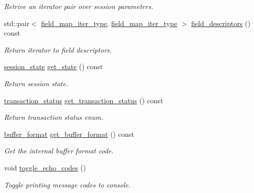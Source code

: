 \begin{DoxyCompactItemize}
\begin{DoxyCompactList}\small\item\em Retrive an iterator pair over session parameters. \end{DoxyCompactList}\item 
std\+::pair$<$ \hyperlink{classsession_a1124fe81d0a0c740c46f101818980aff}{field\+\_\+map\+\_\+iter\+\_\+type}, \hyperlink{classsession_a1124fe81d0a0c740c46f101818980aff}{field\+\_\+map\+\_\+iter\+\_\+type} $>$ \hyperlink{classsession_ab8aef6650e04d8c91bc6ab0b00bb3a81}{field\+\_\+descriptors} () const
\begin{DoxyCompactList}\small\item\em Return iterator to field descriptors. \end{DoxyCompactList}\item 
\mbox{\label{classsession_a974bcf86ffa980ca2677dbdf07907a91}} 
\hyperlink{classsession_a0975e57d194ae722629afe127b70a0b5}{session\+\_\+state} \hyperlink{classsession_a974bcf86ffa980ca2677dbdf07907a91}{get\+\_\+state} () const
\begin{DoxyCompactList}\small\item\em Return session state. \end{DoxyCompactList}\item 
\mbox{\label{classsession_a747aa3669a44dd3c8d1e365eb58b9d53}} 
\hyperlink{classsession_aeb070c1920b6b9948f2d98b4b8787ddb}{transaction\+\_\+status} \hyperlink{classsession_a747aa3669a44dd3c8d1e365eb58b9d53}{get\+\_\+transaction\+\_\+status} () const
\begin{DoxyCompactList}\small\item\em Return transaction status enum. \end{DoxyCompactList}\item 
\mbox{\label{classsession_abe38a58bbafa6f9f6ad28c8c8f65ea6c}} 
\hyperlink{classsession_a960cb940bd12cd63c142c1ffae816b24}{buffer\+\_\+format} \hyperlink{classsession_abe38a58bbafa6f9f6ad28c8c8f65ea6c}{get\+\_\+buffer\+\_\+format} () const
\begin{DoxyCompactList}\small\item\em Get the internal buffer format code. \end{DoxyCompactList}\item 
\mbox{\label{classsession_a244dd533baacba858dab6acc9aeb8980}} 
void \hyperlink{classsession_a244dd533baacba858dab6acc9aeb8980}{toggle\+\_\+echo\+\_\+codes} ()
\begin{DoxyCompactList}\small\item\em Toggle printing message codes to console. \end{DoxyCompactList}\end{DoxyCompactItemize}


